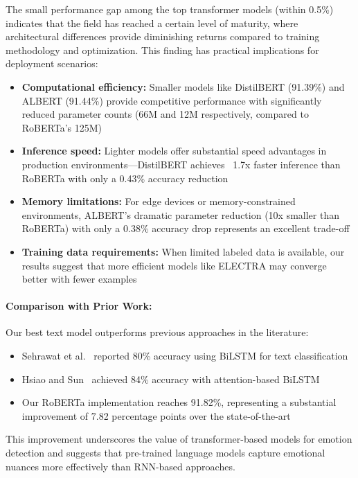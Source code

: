 \documentclass[12pt]{article}
\begin{document}
The small performance gap among the top transformer models (within 0.5\%) indicates that the field has reached a certain level of maturity, where architectural differences provide diminishing returns compared to training methodology and optimization. This finding has practical implications for deployment scenarios:

\begin{itemize}
    \item \textbf{Computational efficiency:} Smaller models like DistilBERT (91.39\%) and ALBERT (91.44\%) provide competitive performance with significantly reduced parameter counts (66M and 12M respectively, compared to RoBERTa's 125M)
    
    \item \textbf{Inference speed:} Lighter models offer substantial speed advantages in production environments—DistilBERT achieves ~1.7x faster inference than RoBERTa with only a 0.43\% accuracy reduction
    
    \item \textbf{Memory limitations:} For edge devices or memory-constrained environments, ALBERT's dramatic parameter reduction (10x smaller than RoBERTa) with only a 0.38\% accuracy drop represents an excellent trade-off
    
    \item \textbf{Training data requirements:} When limited labeled data is available, our results suggest that more efficient models like ELECTRA may converge better with fewer examples
\end{itemize}

\paragraph{Comparison with Prior Work:}
Our best text model outperforms previous approaches in the literature:
\begin{itemize}
    \item Sehrawat et al.~\cite{sehrawat2023deception} reported 80\% accuracy using BiLSTM for text classification
    \item Hsiao and Sun~\cite{hsiao2022attention} achieved 84\% accuracy with attention-based BiLSTM
    \item Our RoBERTa implementation reaches 91.82\%, representing a substantial improvement of 7.82 percentage points over the state-of-the-art
\end{itemize}

This improvement underscores the value of transformer-based models for emotion detection and suggests that pre-trained language models capture emotional nuances more effectively than RNN-based approaches.
\end{document}
